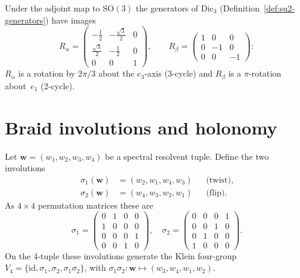 \begin{definition}
\label{def:so3-generators}
Under the adjoint map to $\mathrm{SO}(3)$ the generators of
$\mathrm{Dic}_3$ (Definition~\ref{def:su2-generators}) have images
\begin{equation}\label{eq:so3-generators}
  R_\alpha
  =\begin{pmatrix}
    -\frac{1}{2}&-\frac{\sqrt{3}}{2}&0\\[3pt]
    \frac{\sqrt{3}}{2}&-\frac{1}{2}&0\\[3pt]
    0&0&1
  \end{pmatrix},\qquad
  R_\beta
  =\begin{pmatrix}
    1&0&0\\[2pt]
    0&-1&0\\[2pt]
    0&0&-1
  \end{pmatrix}:
\end{equation}
$R_\alpha$ is a rotation by $2\pi/3$ about the $e_3$-axis (3-cycle) and
$R_\beta$ is a $\pi$-rotation about~$e_1$ (2-cycle).
\end{definition}


\section{Braid involutions and holonomy}
\label{sec:braid-involutions}

\begin{definition}
\label{def:braid-twist-flip}
Let $\mathbf{w}=(w_1,w_2,w_3,w_4)$ be a spectral resolvent tuple.
Define the two involutions
\begin{align}
  \sigma_1(\mathbf{w}) &= (w_2,w_1,w_4,w_3)
    &&\text{(twist),}
    \label{eq:braid-twist}\\[4pt]
  \sigma_2(\mathbf{w}) &= (w_4,w_3,w_2,w_1)
    &&\text{(flip).}
    \label{eq:braid-flip}
\end{align}
As $4\times 4$ permutation matrices these are
\begin{equation}\label{eq:perm-matrices}
  \sigma_1=\begin{pmatrix}
    0&1&0&0\\1&0&0&0\\0&0&0&1\\0&0&1&0
  \end{pmatrix},\quad
  \sigma_2=\begin{pmatrix}
    0&0&0&1\\0&0&1&0\\0&1&0&0\\1&0&0&0
  \end{pmatrix}.
\end{equation}
On the 4-tuple these involutions generate the Klein four-group
$V_4=\{\mathrm{id},\sigma_1,\sigma_2,\sigma_1\sigma_2\}$, with
$\sigma_1\sigma_2\colon\mathbf{w}\mapsto(w_3,w_4,w_1,w_2)$.
\end{definition}

